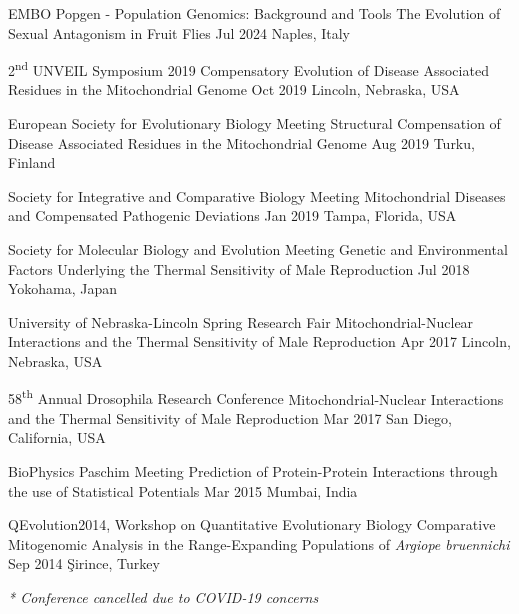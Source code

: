\vspace{\baselineskip}
\vspace{-1mm}


\begin{cventries}

 \cvpresentation
    {EMBO Popgen - Population Genomics: Background and Tools}
    {The Evolution of Sexual Antagonism in Fruit Flies}
    {Jul 2024}
    {Naples, Italy}

 \cvpresentation
    {2\textsuperscript{nd} UNVEIL Symposium 2019}
    {Compensatory Evolution of Disease Associated Residues in the Mitochondrial Genome}
    {Oct 2019}
    {Lincoln, Nebraska, USA}

  \cvpresentation
    {European Society for Evolutionary Biology Meeting} %
    {Structural Compensation of Disease Associated Residues in the Mitochondrial Genome} %
    {Aug 2019} %
    {Turku, Finland} %

  \cvpresentation
    {Society for Integrative and Comparative Biology Meeting}
    {Mitochondrial Diseases and Compensated Pathogenic Deviations}
    {Jan 2019}
    {Tampa, Florida, USA}

  \cvpresentation
    {Society for Molecular Biology and Evolution Meeting}
    {Genetic and Environmental Factors Underlying the Thermal Sensitivity of Male Reproduction}
    {Jul 2018}
    {Yokohama, Japan}

  \cvpresentation
    {University of Nebraska-Lincoln Spring Research Fair}
    {Mitochondrial-Nuclear Interactions and the Thermal Sensitivity of Male Reproduction}
    {Apr 2017}
    {Lincoln, Nebraska, USA}

  \cvpresentation
    {58\textsuperscript{th} Annual Drosophila Research Conference}
    {Mitochondrial-Nuclear Interactions and the Thermal Sensitivity of Male Reproduction}
    {Mar 2017}
    {San Diego, California, USA}

   \cvpresentation
    {BioPhysics Paschim Meeting}
    {Prediction of Protein-Protein Interactions through the use of Statistical Potentials}
    {Mar 2015}
    {Mumbai, India}

  \cvpresentation
    {QEvolution2014, Workshop on Quantitative Evolutionary Biology}
    {Comparative Mitogenomic Analysis in the Range-Expanding Populations of \textit{Argiope bruennichi}}
    {Sep 2014}
    {\c{S}irince, Turkey}

\begin{flushleft}
\fontsize{10pt}{1em}\bodyfontlight\itshape\color{graytext} * Conference cancelled due to COVID-19 concerns
\end{flushleft}

\end{cventries}
